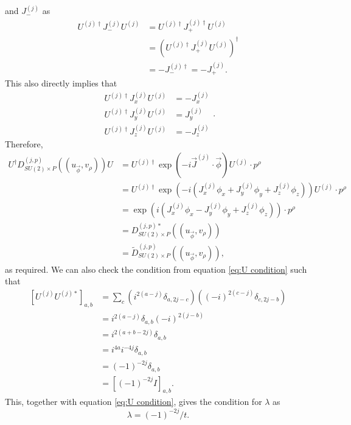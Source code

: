 \documentclass[preprint, 12pt]{revtex4-2}
\numberwithin{equation}{section}
\begin{document}
and $J^{(j)}_-$ as
\begin{equation}\label{eq:Udagger J- U}
    \begin{aligned}
        U^{(j)\dagger}J_-^{(j)}U^{(j)} &= U^{(j)\dagger}J_+^{(j)\dagger}U^{(j)} \\
        &= \left(U^{(j)\dagger}J_+^{(j)}U^{(j)}\right)^\dagger \\
        &= -J_-^{(j)\dagger} = -J_+^{(j)}.
    \end{aligned}
\end{equation}
This also directly implies that
\begin{equation}\label{eq:Udagger Js U}
    \begin{aligned}
        U^{(j)\dagger}J_x^{(j)}U^{(j)} &= -J_x^{(j)} \\
        U^{(j)\dagger}J_y^{(j)}U^{(j)} &= J_y^{(j)} \\
        U^{(j)\dagger}J_z^{(j)}U^{(j)} &= -J_z^{(j)}
    \end{aligned}.
\end{equation}
Therefore,
\begin{equation}\label{eq:U basis theta basis equivalence}
    \begin{aligned}
        U^\dagger D_{SU(2)\times P}^{(j,p)}((u_{\vec{\phi}}, v_\rho))U &= U^{(j)\dagger}\exp(-i\vec{J}^{(j)}\cdot\vec{\phi})U^{(j)}\cdot p^\rho \\ 
        &= U^{(j)\dagger}\exp(-i(J_x^{(j)}\phi_x+J_y^{(j)}\phi_y+J_z^{(j)}\phi_z))U^{(j)}\cdot p^\rho \\
        &= \exp(i(J_x^{(j)}\phi_x-J_y^{(j)}\phi_y+J_z^{(j)}\phi_z))\cdot p^\rho \\
        &= D_{SU(2)\times P}^{(j,p)\ast}((u_{\vec{\phi}}, v_\rho)) \\
        &= \tilde{D}_{SU(2)\times P}^{(j,p)}((u_{\vec{\phi}}, v_\rho)),
    \end{aligned}
\end{equation}
as required. We can also check the condition from equation \ref{eq:U condition} such that
\begin{equation}\label{eq:check U condition}
    \begin{aligned}
        \left[U^{(j)}U^{(j)\ast}\right]_{a,b} &= \sum_{c}\left(i^{2(a-j)}\delta_{a,2j-c}\right)\left((-i)^{2(c-j)}\delta_{c,2j-b}\right) \\
        &= i^{2(a-j)}\delta_{a,b}(-i)^{2(j-b)} \\
        &= i^{2(a+b-2j)}\delta_{a,b} \\
        &= i^{4a}i^{-4j}\delta_{a,b} \\
        &= (-1)^{-2j}\delta_{a,b} \\
        &= \left[(-1)^{-2j}I\right]_{a,b}.
    \end{aligned}
\end{equation}
This, together with equation \ref{eq:U condition}, gives the condition for $\lambda$ as
\begin{equation}\label{eq:lambda condition}
    \lambda = (-1)^{-2j}/t.
\end{equation}
\end{document}
